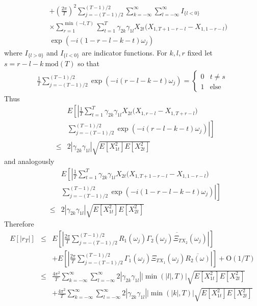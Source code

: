 \documentclass[11pt]{article}
\begin{document}
\begin{appendix}
\begin{eqnarray*}
&&+\left(\frac{2\pi}{T}\right)^2\sum_{j=-(T-1)/2}^{(T-1)/2}\sum_{k=-\infty}^\infty
\sum_{l=-\infty}^\infty
I_{\{l<0\}}\\
&&\times\sum_{r=1}^{\min(-l,T)} \sum_{t=1}^{T} \gamma_{2k}\gamma_{1l}X_{2t} \Big(X_{1,T+1-r-l}-X_{1,1-r-l}\Big)\\
&&\exp(-i(1-r-l-k-t)\omega_j)
\end{eqnarray*}
where $I_{\{l>0\}}$ and $I_{\{l<0\}}$ are indicator functions. For
$k,l,r$ fixed let\\ $s=r-l-k ~\textrm{mod}(T)$ so that
\begin{eqnarray*}
\frac{1}{T}\sum_{j=-(T-1)/2}^{(T-1)/2}
\exp(-i(r-l-k-t)\omega_j)=\left\{\begin{array}{cc}
0& t\not=s\\
1& \textrm{else}
\end{array}\right.
\end{eqnarray*}
Thus
\begin{eqnarray*}
&&E\left[\left|\frac{1}{T} \sum_{t=1}^{T}
\gamma_{2k}\gamma_{1l}X_{2t} \Big(X_{1,r-l}-X_{1,T+r-l}\Big)\right.\right.\\
&&\left.\left.\sum_{j=-(T-1)/2}^{(T-1)/2}\exp(-i(r-l-k-t)\omega_j)\right|\right]\\
&\leq& 2|\gamma_{2k}\gamma_{1l}|\sqrt{E[X_{1t}^2]E[X_{2t}^2]}
\end{eqnarray*}
and analogously
\begin{eqnarray*}
&&E\left[\left|\frac{1}{T} \sum_{t=1}^{T}
\gamma_{2k}\gamma_{1l}X_{2t}
\Big(X_{1,T+1-r-l}-X_{1,1-r-l}\Big)\right.\right.\\
&&\left.\left. \sum_{j=-(T-1)/2}^{(T-1)/2}\exp(-i(1-r-l-k-t)\omega_j)\right|\right]\\
&\leq& 2|\gamma_{2k}\gamma_{1l}|\sqrt{E[X_{1t}^2]E[X_{2t}^2]}
\end{eqnarray*}
Therefore
\begin{eqnarray*}
E[|r_T|]&\leq&E\left[\left|\frac{2\pi}{T}\sum_{j=-(T-1)/2}^{(T-1)/2}R_1(\omega_j)
\overline{\Gamma_2(\omega_j)\Xi_{TX_2}(\omega_j)}\right|\right]\\
&&+E\left[\left|\frac{2\pi}{T}\sum_{j=-(T-1)/2}^{(T-1)/2}\Gamma_1(\omega_j)\Xi_{TX_1}(\omega_j)\overline{R_2(\omega)}
\right|\right]+\textrm{O}(1/T)\\
&\leq& \frac{4\pi^2}{T}\sum_{k=-\infty}^\infty
\sum_{l=-\infty}^\infty 2
|\gamma_{2k}\gamma_{1l}||\min(|l|,T)|\sqrt{E[X_{1t}^2]E[X_{2t}^2]}\\
&&+ \frac{4\pi^2}{T}\sum_{k=-\infty}^\infty \sum_{l=-\infty}^\infty
2
|\gamma_{2k}\gamma_{1l}||\min(|k|,T)|\sqrt{E[X_{1t}^2]E[X_{2t}^2]}\\

\end{eqnarray*}
\end{appendix}
\end{document}
